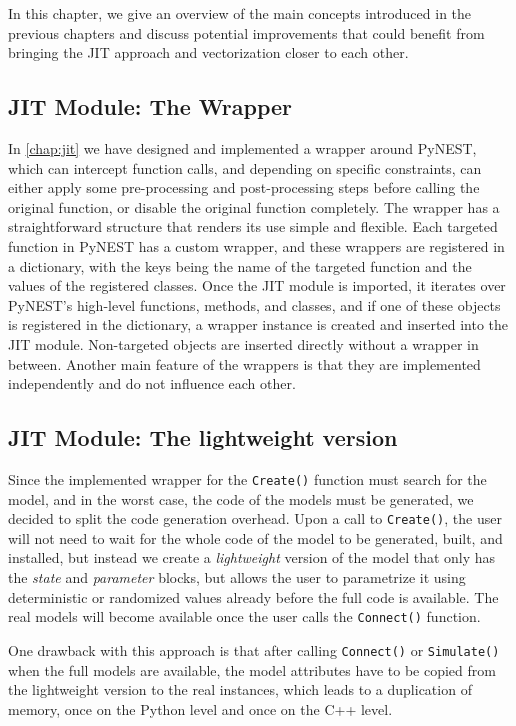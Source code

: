 In this chapter, we give an overview of the main concepts introduced in the previous chapters and discuss potential improvements that could benefit from bringing the JIT approach and vectorization closer to each other.

\subsection*{JIT Module: The Wrapper}

In \autoref{chap:jit} we have designed and implemented a wrapper around PyNEST, which can intercept function calls, and depending on specific constraints, can either apply some pre-processing and post-processing steps before calling the original function, or disable the original function completely. The wrapper has a straightforward structure that renders its use simple and flexible. Each targeted function in PyNEST has a custom wrapper, and these wrappers are registered in a dictionary, with the keys being the name of the targeted function and the values of the registered classes. Once the JIT module is imported, it iterates over PyNEST's high-level functions, methods, and classes, and if one of these objects is registered in the dictionary, a wrapper instance is created and inserted into the JIT module. Non-targeted objects are inserted directly without a wrapper in between. Another main feature of the wrappers is that they are implemented independently and do not influence each other.

\subsection{JIT Module: The lightweight version}
Since the implemented wrapper for the \texttt{Create()} function must search for the model, and in the worst case, the code of the models must be generated, we decided to split the code generation overhead. Upon a call to \texttt{Create()}, the user will not need to wait for the whole code of the model to be generated, built, and installed, but instead we create a \emph{lightweight} version of the model that only has the \emph{state} and \emph{parameter} blocks, but allows the user to parametrize it using deterministic or randomized values already before the full code is available. The real models will become available once the user calls the \texttt{Connect()} function.

One drawback with this approach is that after calling \texttt{Connect()} or \texttt{Simulate()} when the full models are available, the model attributes have to be copied from the lightweight version to the real instances, which leads to a duplication of memory, once on the Python level and once on the C++ level.

